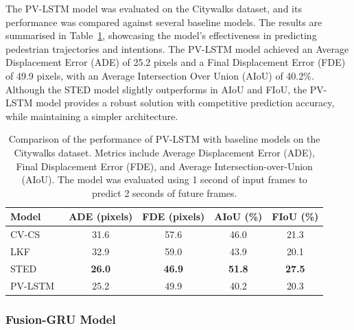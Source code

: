 \documentclass[12pt,oneside]{book} %
\begin{document}
The PV-LSTM model was evaluated on the Citywalks dataset, and its performance
was compared against several baseline models. The results are summarised in
Table~\ref{tab:pv-lstm-results}, showcasing the model's effectiveness in
predicting pedestrian trajectories and intentions. The PV-LSTM model achieved
an Average Displacement Error (ADE) of 25.2 pixels and a Final Displacement
Error (FDE) of 49.9 pixels, with an Average Intersection Over Union (AIoU) of
40.2\%. Although the STED model slightly outperforms in AIoU and FIoU, the
PV-LSTM model provides a robust solution with competitive prediction accuracy,
while maintaining a simpler architecture.

\begin{table}[H]
    \centering
    \caption{Comparison of the performance of PV-LSTM with baseline models on the Citywalks dataset. Metrics include Average Displacement Error (ADE), Final Displacement Error (FDE), and Average Intersection-over-Union (AIoU). The model was evaluated using 1 second of input frames to predict 2 seconds of future frames.}
    \begin{adjustbox}{max width=\textwidth}
        \begin{tabular}{lcccc}
            \toprule
            \textbf{Model}                                   & \textbf{ADE (pixels)} & \textbf{FDE (pixels)} & \textbf{AIoU (\%)} & \textbf{FIoU (\%)} \\ 
            \midrule
            CV-CS~\cite{DBLP:journals/corr/abs-2010-10270}   & 31.6                  & 57.6                  & 46.0               & 21.3               \\
            LKF~\cite{DBLP:journals/corr/abs-2010-10270}     & 32.9                  & 59.0                  & 43.9               & 20.1               \\
            STED~\cite{DBLP:journals/corr/abs-2010-10270}    & \textbf{26.0}         & \textbf{46.9}         & \textbf{51.8}      & \textbf{27.5}      \\
            PV-LSTM~\cite{DBLP:journals/corr/abs-2010-10270} & 25.2                  & 49.9                  & 40.2               & 20.3               \\
            \bottomrule
        \end{tabular}
    \end{adjustbox}
    \label{tab:pv-lstm-results}
\end{table}

\subsubsection*{Fusion-GRU Model}
\end{document}
